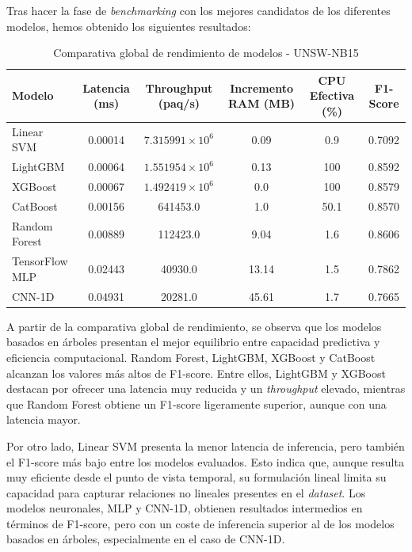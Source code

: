 Tras hacer la fase de \textit{benchmarking} con los mejores candidatos de los diferentes modelos, hemos obtenido los siguientes resultados:

\begin{table}[H]
    \centering
    \small
    \begin{tabular}{|l|c|c|c|c|c|}
        \hline
        \textbf{Modelo} & \textbf{Latencia (ms)} & \textbf{Throughput (paq/s)} & \textbf{Incremento RAM (MB)} & \textbf{CPU Efectiva (\%)} & \textbf{F1-Score} \\
        \hline
        Linear SVM & 0.00014 & $7.315991 \times 10^{6}$ & 0.09 & 0.9 & 0.7092 \\
        \hline
        LightGBM & 0.00064 & $1.551954 \times 10^{6}$ & 0.13 & 100 & 0.8592 \\
        \hline
        XGBoost & 0.00067 & $1.492419 \times 10^{6}$ & 0.0 & 100 & 0.8579 \\
        \hline
        CatBoost & 0.00156 & 641453.0 & 1.0 & 50.1 & 0.8570 \\
        \hline
        Random Forest & 0.00889 & 112423.0 & 9.04 & 1.6 & 0.8606 \\
        \hline
        TensorFlow MLP & 0.02443 & 40930.0 & 13.14 & 1.5 & 0.7862 \\
        \hline
        CNN-1D & 0.04931 & 20281.0 & 45.61 & 1.7 & 0.7665 \\
        \hline
    \end{tabular}
    \caption{Comparativa global de rendimiento de modelos - UNSW-NB15}
    \label{tab:hardware_benchmark_global}
\end{table}

A partir de la comparativa global de rendimiento, se observa que los modelos basados en árboles presentan el mejor equilibrio entre capacidad predictiva y eficiencia computacional. Random Forest, LightGBM, XGBoost y CatBoost alcanzan los valores más altos de F1-score. Entre ellos, LightGBM y XGBoost destacan por ofrecer una latencia muy reducida y un \textit{throughput} elevado, mientras que Random Forest obtiene un F1-score ligeramente superior, aunque con una latencia mayor.

Por otro lado, Linear SVM presenta la menor latencia de inferencia, pero también el F1-score más bajo entre los modelos evaluados. Esto indica que, aunque resulta muy eficiente desde el punto de vista temporal, su formulación lineal limita su capacidad para capturar relaciones no lineales presentes en el \textit{dataset}. Los modelos neuronales, MLP y CNN-1D, obtienen resultados intermedios en términos de F1-score, pero con un coste de inferencia superior al de los modelos basados en árboles, especialmente en el caso de CNN-1D.


